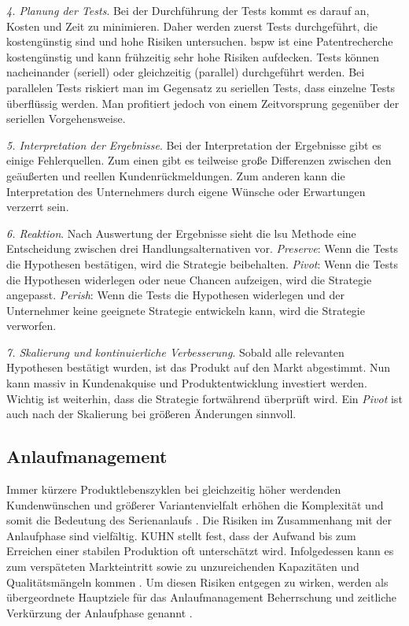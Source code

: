 \textit{4. Planung der Tests}. Bei der Durchführung der Tests kommt es darauf an, Kosten und Zeit zu minimieren. Daher werden zuerst Tests durchgeführt, die kostengünstig sind und hohe Risiken untersuchen. \Gls{bspw} ist eine Patentrecherche kostengünstig und kann frühzeitig sehr hohe Risiken aufdecken. Tests können nacheinander (seriell) oder gleichzeitig (parallel) durchgeführt werden. Bei parallelen Tests riskiert man im Gegensatz zu seriellen Tests, dass einzelne Tests überflüssig werden. Man profitiert jedoch von einem Zeitvorsprung gegenüber der seriellen Vorgehensweise. 

\textit{5. Interpretation der Ergebnisse}. Bei der Interpretation der Ergebnisse gibt es einige Fehlerquellen. Zum einen gibt es teilweise große Differenzen zwischen den geäußerten und reellen Kundenrückmeldungen. Zum anderen kann die Interpretation des Unternehmers durch eigene Wünsche oder Erwartungen verzerrt sein.

\textit{6. Reaktion}. Nach Auswertung der Ergebnisse sieht die \gls{lsu} Methode eine Entscheidung zwischen drei Handlungsalternativen vor. \textit{Preserve}: Wenn die Tests die Hypothesen bestätigen, wird die Strategie beibehalten. \textit{Pivot}: Wenn die Tests die Hypothesen widerlegen oder neue Chancen aufzeigen, wird die Strategie angepasst. \textit{Perish}: Wenn die Tests die Hypothesen widerlegen und der Unternehmer keine geeignete Strategie entwickeln kann, wird die Strategie verworfen. 

\textit{7. Skalierung und kontinuierliche Verbesserung}. Sobald alle relevanten Hypothesen bestätigt wurden, ist das Produkt auf den Markt abgestimmt. Nun kann massiv in Kundenakquise und Produktentwicklung investiert werden. Wichtig ist weiterhin, dass die Strategie fortwährend überprüft wird. Ein \textit{Pivot} ist auch nach der Skalierung bei größeren Änderungen sinnvoll. 


\subsection{Anlaufmanagement}
Immer kürzere Produktlebenszyklen bei gleichzeitig höher werdenden Kundenwünschen und größerer Variantenvielfalt erhöhen die Komplexität und somit die Bedeutung des Serienanlaufs \cite{Kuhn2002,Schuh2004}. Die Risiken im Zusammenhang mit der Anlaufphase sind vielfältig. KUHN 
stellt fest, dass der Aufwand bis zum Erreichen einer stabilen Produktion oft unterschätzt wird. Infolgedessen kann es zum verspäteten Markteintritt sowie zu unzureichenden Kapazitäten und Qualitätsmängeln kommen \cite{Kuhn2002}. Um diesen Risiken entgegen zu wirken, werden als übergeordnete Hauptziele für das Anlaufmanagement Beherrschung und zeitliche Verkürzung der Anlaufphase genannt \cite{Kuhn2002, Schmitt2015}. 

